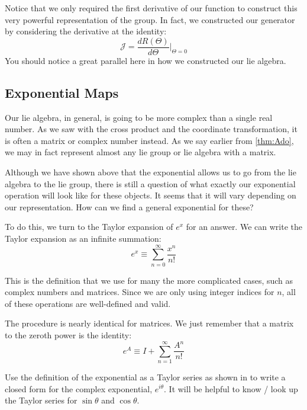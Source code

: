 Notice that we only required the first derivative of our function to construct this very powerful representation of the group. In fact, we constructed our generator by considering the derivative at the identity:
$$\mathcal{J}=\frac{dR(\Theta)}{d\Theta}\Biggr\rvert_{\Theta=0}$$
You should notice a great parallel here in how we constructed our \gls{lie algebra}.

\subsection{Exponential Maps}

Our \gls{lie algebra}, in general, is going to be more complex than a single real number. As we saw with the cross product and the coordinate transformation, it is often a matrix or complex number instead. As we say earlier from \autoref{thm:Ado}, we may in fact represent almost any \gls{lie group} or 
\gls{lie algebra} with a matrix.

Although we have shown above that the exponential allows us to go from the \gls{lie algebra} to the \gls{lie group}, there is still a question of what exactly our exponential operation will look like for these objects. It seems that it will vary depending on our representation. How can we find a general exponential for these?

To do this, we turn to the Taylor expansion of $e^x$ for an answer. We can write the Taylor expansion as an infinite summation:
\begin{equation}\label{eq:taylor exp}
    e^x\equiv\sum_{n=0}^\infty{\frac{x^n}{n!}}
\end{equation}

This is the definition that we use for many the more complicated cases, such as complex numbers and matrices. Since we are only using integer indices for $n$, all of these operations are well-defined and valid.

The procedure is nearly identical for matrices. We just remember that a matrix to the zeroth power is the identity:
\begin{equation}\label{eq:taylor exp}
    e^A\equiv I+\sum_{n=1}^\infty{\frac{A^n}{n!}}
\end{equation}

\begin{exercise}
    Use the definition of the exponential as a Taylor series as shown in  to write a closed form for the complex exponential, $e^{i\theta}$. It will be helpful to know / look up the Taylor series for $\sin\theta$ and $\cos\theta$.
\end{exercise}

